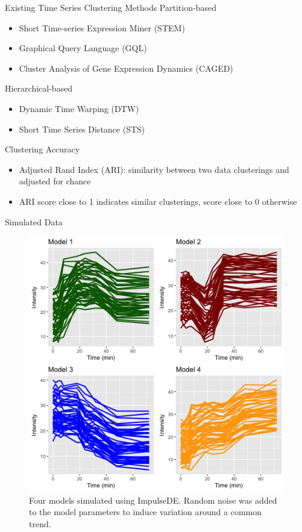 \documentclass[10pt]{beamer}
\begin{document}
\begin{frame}{Existing Time Series Clustering Methods}
Partition-based
\begin{itemize}
\item Short Time-series Expression Miner (STEM)
\item Graphical Query Language (GQL)
\item Cluster Analysis of Gene Expression Dynamics (CAGED)
\end{itemize}
Hierarchical-based
\begin{itemize}
\item Dynamic Time Warping (DTW)
\item Short Time Series Distance (STS)
\end{itemize}
\end{frame}


\begin{frame}{Clustering Accuracy}
\begin{itemize}
\item  Adjusted Rand Index (ARI): similarity between two data clusterings and adjusted for chance 
\item  ARI score close to 1 indicates similar clusterings, score close to 0 otherwise
\end{itemize}
\end{frame}


\begin{frame}{Simulated Data}
\begin{figure}
     \includegraphics[width=0.65\linewidth]{Simulation_plot.png}
      \caption{Four models simulated using ImpulseDE. Random noise was added to the model parameters to induce variation around a common trend.}
       \label{fig:simdata}
    \end{figure}
\end{frame}
\end{document}
